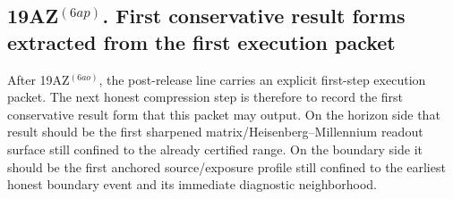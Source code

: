 \subsection*{19AZ$^{(6ap)}$. First conservative result forms extracted from the first execution packet}
\label{sec:first-conservative-result-forms-extracted-from-the-first-execution-packet}
After 19AZ$^{(6ao)}$, the post-release line carries an explicit first-step execution packet. The next honest compression step is therefore to record the first conservative result form that this packet may output. On the horizon side that result should be the first sharpened matrix/Heisenberg--Millennium readout surface still confined to the already certified range. On the boundary side it should be the first anchored source/exposure profile still confined to the earliest honest boundary event and its immediate diagnostic neighborhood.

